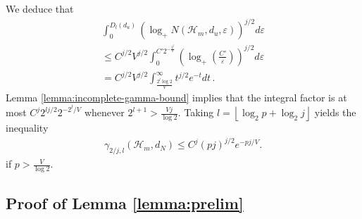 \documentclass[12pt]{article}
\def\l{\left}
\def\r{\right}
\theoremstyle{thmstyletwo}%
\theoremstyle{thmstylethree}%
\begin{document}
We deduce that
\begin{multline*}
    \int_0^{D_l(d_u)} \l(\log_+ N\l(\mathcal{H}_m, d_u, \varepsilon \r)\r)^{j/2} d\varepsilon 
    \\
    \leq  C^{j/2}V^{j/2}\int_0^{C' 2^{-\frac{2^l}{V}}} \l(\log_+\l(\frac{C'}{\varepsilon}\r)\r)^{j/2} d\varepsilon \\
    = C^{j/2}V^{j/2} \int_{\frac{2^l \log 2}{V}}^\infty t^{j/2}e^{-t} dt\,.
\end{multline*}
Lemma \ref{lemma:incomplete-gamma-bound} implies that the integral factor is at most $C^j 2^{lj/2} 2^{-2^l/V}$ whenever $2^{l+1} > \frac{Vj}{\log 2}$. Taking $l = \l\lfloor\log_2 p + \log_2 j \r\rfloor$ yields the inequality
\begin{align*}
    \gamma_{2/j, l} (\mathcal{H}_m, d_N)\leq 
    C^j (pj)^{j/2} e^{-pj/V}.
\end{align*}
if $p > \frac{V}{\log 2}$.

\subsection{Proof of Lemma \ref{lemma:prelim}}
\label{proof:lemma:prelim}
\end{document}
